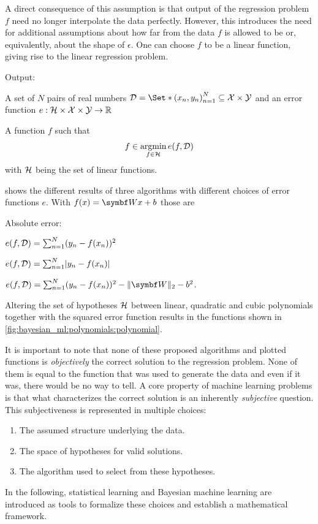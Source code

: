 A direct consequence of this assumption is that output of the regression problem $f$ need no longer interpolate the data perfectly.
However, this introduces the need for additional assumptions about how far from the data $f$ is allowed to be or, equivalently, about the shape of $\epsilon$.
One can choose $f$ to be a linear function, giving rise to the linear regression problem.
\begin{problem}
\begin{labeling}{Output:}
    \item[Input:] A set of $N$ pairs of real numbers $\Dc = \Set*{\left(x_n, y_n\right)}_{n=1}^N \subseteq \Xc \times \Yc$ and an error function $e : \mathcal{H} \times \mathcal{X} \times \mathcal{Y} \to \mathbb{R}$
    \item[Output:] A function $f$ such that
    \begin{align}
        f \in \operatorname*{argmin}_{f \in \mathcal{H}} e(f, \mathcal{D})
    \end{align}
    with $\mathcal{H}$ being the set of linear functions.
\end{labeling}
\end{problem}
 shows the different results of three algorithms with different choices of error functions $e$.
With $f(x) = \mat{W}x + b$ those are
\begin{labeling}{Absolute error:}
    \item[Squared error:] $e(f, \mathcal{D}) = \sum_{n=1}^N (y_n - f(x_n))^2$
    \item[Absolute error:] $e(f, \Dc) = \sum_{n=1}^N \abs{y_n - f(x_n)}$
    \item[Ridge:] $e(f, \Dc) = \sum_{n=1}^N (y_n - f(x_n))^2 - \norm{\mat{W}}_2 - b^2$.
\end{labeling}
Altering the set of hypotheses $\mathcal{H}$ between linear, quadratic and cubic polynomials together with the squared error function results in the functions shown in \cref{fig:bayesian_ml:polynomials:polynomial}.

It is important to note that none of these proposed algorithms and plotted functions is \emph{objectively} the correct solution to the regression problem.
None of them is equal to the function that was used to generate the data and even if it was, there would be no way to tell.
A core property of machine learning problems is that what characterizes the correct solution is an inherently \emph{subjective} question.
This subjectiveness is represented in multiple choices:
\begin{enumerate}
    \item The assumed structure underlying the data.
    \item The space of hypotheses for valid solutions.
    \item The algorithm used to select from these hypotheses.
\end{enumerate}
In the following, statistical learning and Bayesian machine learning are introduced as tools to formalize these choices and establish a mathematical framework.

